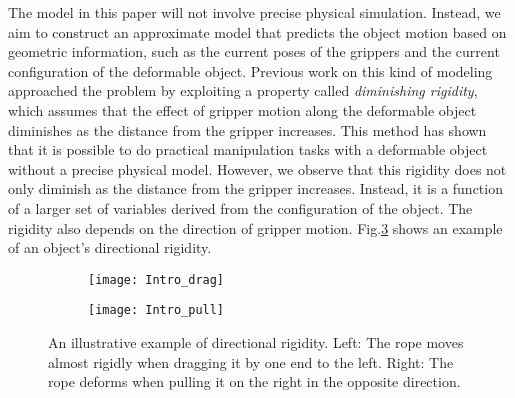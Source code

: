 

The model in this paper will not involve precise physical simulation. Instead, we aim to construct an approximate model that predicts the object motion based on geometric information, such as the current poses of the grippers and the current configuration of the deformable object. Previous work on this kind of modeling \cite{Berenson2013} approached the problem by exploiting a property called \textit{diminishing rigidity}, which assumes that the effect of gripper motion along the deformable object diminishes as the distance from the gripper increases. 
This method has shown that it is possible to do practical manipulation tasks with a deformable object without a precise physical model. 
However, we observe that this rigidity does not only diminish as the distance from the gripper increases. Instead, it is a function of a larger set of variables derived from the configuration of the object. The rigidity also depends on the direction of gripper motion. Fig.\ref{Fig: intro_Directional_rigidity} shows an example of an object's directional rigidity.

\begin{figure}[t]
\begin{subfigure}{.26\textwidth}
  \centering
  \texttt{[image: Intro\_drag]}
  \label{Fig: Intro_drag}
\end{subfigure}%
\begin{subfigure}{.24\textwidth}
  \centering
  \texttt{[image: Intro\_pull]}
  \label{Fig: Intro_pull}
\end{subfigure}
\caption{An illustrative example of directional rigidity. Left: The rope moves almost rigidly when dragging it by one end to the left. Right: The rope deforms when pulling it on the right in the opposite direction.}
\label{Fig: intro_Directional_rigidity}
\end{figure}



